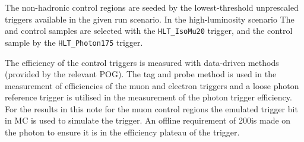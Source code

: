 The non-hadronic control regions are seeded by the lowest-threshold unprescaled 
triggers available in the given run scenario. In the high-luminosity scenario The 
\mj and \mmj control samples are selected with the \verb!HLT_IsoMu20! trigger,
and the \gj control sample by the \verb!HLT_Photon175! trigger. 

The efficiency of the control triggers is measured with data-driven methods
(provided by the relevant POG). The tag and probe method is used in the measurement of
efficiencies of the muon and electron triggers and a loose photon reference trigger 
is utilised in the measurement of the photon trigger efficiency. For the results in 
this note for the muon control regions the emulated trigger bit in MC is used to simulate 
the trigger. An offline \Pt requirement of 200\GeV is made on the photon
to ensure it is in the efficiency plateau of the trigger.



